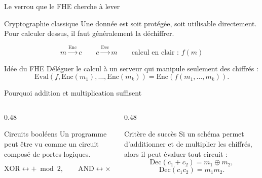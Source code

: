 \documentclass[10pt,aspectratio=169]{beamer}
\newcommand{\Enc}{\mathrm{Enc}}
\newcommand{\Dec}{\mathrm{Dec}}
\newcommand{\Eval}{\mathrm{Eval}}
\begin{document}
\begin{frame}{Le verrou que le FHE cherche à lever}
  \begin{block}{Cryptographie classique}
    Une donnée est soit protégée, soit utilisable directement. Pour calculer dessus, il faut généralement la déchiffrer.
  \end{block}

  \vspace{0.25cm}
  \begin{center}
    \[
      m \xrightarrow{\Enc} c
      \qquad
      c \xrightarrow{\Dec} m
      \qquad
      \text{calcul en clair : } f(m)
    \]
  \end{center}

  \begin{exampleblock}{Idée du FHE}
    Déléguer le calcul à un serveur qui manipule seulement des chiffrés :
    \[
      \Eval(f,\Enc(m_1),\ldots,\Enc(m_k))
      =
      \Enc(f(m_1,\ldots,m_k)).
    \]
  \end{exampleblock}
\end{frame}

\begin{frame}{Pourquoi addition et multiplication suffisent}
  \begin{columns}[T,onlytextwidth]
    \begin{column}{0.48\textwidth}
      \begin{block}{Circuits booléens}
        Un programme peut être vu comme un circuit composé de portes logiques.
      \end{block}
      \[
        \text{XOR} \leftrightarrow + \bmod 2,
        \qquad
        \text{AND} \leftrightarrow \times \bmod 2.
      \]
    \end{column}
    \begin{column}{0.48\textwidth}
      \begin{block}{Critère de succès}
        Si un schéma permet d'additionner et de multiplier les chiffrés, alors il peut évaluer tout circuit :
        \[
          \Dec(c_1+c_2)=m_1\oplus m_2,
        \]
        \[
          \Dec(c_1c_2)=m_1m_2.
        \]
      \end{block}
    \end{column}
  \end{columns}
\end{frame}
\end{document}
